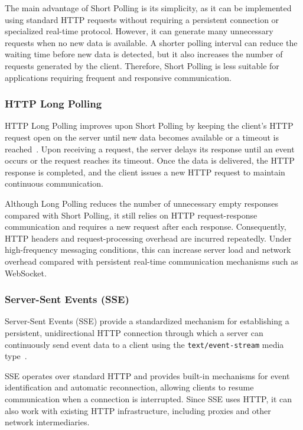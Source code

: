 \documentclass[12pt, a4paper]{article}
\begin{document}
The main advantage of Short Polling is its simplicity, as it can be implemented using standard HTTP requests without requiring a persistent connection or specialized real-time protocol. However, it can generate many unnecessary requests when no new data is available. A shorter polling interval can reduce the waiting time before new data is detected, but it also increases the number of requests generated by the client. Therefore, Short Polling is less suitable for applications requiring frequent and responsive communication.

\subsubsection{HTTP Long Polling}

HTTP Long Polling improves upon Short Polling by keeping the client's HTTP request open on the server until new data becomes available or a timeout is reached~\cite{rfc6202}. Upon receiving a request, the server delays its response until an event occurs or the request reaches its timeout. Once the data is delivered, the HTTP response is completed, and the client issues a new HTTP request to maintain continuous communication.

Although Long Polling reduces the number of unnecessary empty responses compared with Short Polling, it still relies on HTTP request-response communication and requires a new request after each response. Consequently, HTTP headers and request-processing overhead are incurred repeatedly. Under high-frequency messaging conditions, this can increase server load and network overhead compared with persistent real-time communication mechanisms such as WebSocket.

\subsubsection{Server-Sent Events (SSE)}

Server-Sent Events (SSE) provide a standardized mechanism for establishing a persistent, unidirectional HTTP connection through which a server can continuously send event data to a client using the \texttt{text/event-stream} media type~\cite{w3c_sse}.

SSE operates over standard HTTP and provides built-in mechanisms for event identification and automatic reconnection, allowing clients to resume communication when a connection is interrupted. Since SSE uses HTTP, it can also work with existing HTTP infrastructure, including proxies and other network intermediaries.
\end{document}
